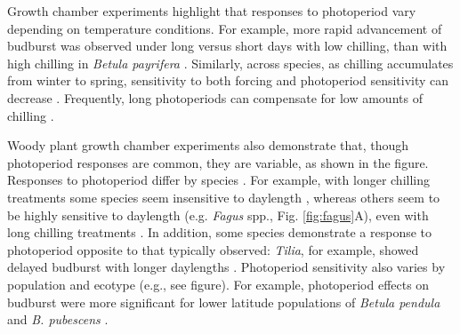 \documentclass{article}
\begin{document}
\par Growth chamber experiments highlight that responses to photoperiod vary depending on temperature conditions. For example, more rapid advancement of budburst was observed under long versus short days with low chilling, than with high chilling in \emph{Betula payrifera} \citep[][see figure]{Hawkins:2012}. Similarly, across species, as chilling accumulates from winter to spring, sensitivity to both forcing and photoperiod sensitivity can decrease \citep{malyshev2018}. Frequently, long photoperiods can compensate for low amounts of chilling \citep{Caffarra:2011b,Myking:1995,Heide:1993}.%
\par Woody plant growth chamber experiments also demonstrate that, though photoperiod responses are common, they are variable, as shown in the figure. Responses to photoperiod differ by species \citep[e.g.,][]{flynn2018,zohner2016,Basler:2014aa,Basler:2012,Howe:1996,Heide:1993a}.
For example, with longer chilling treatments some species seem insensitive to daylength \citep[e.g., \emph{Hammamelis} spp., \emph{Prunus} spp.,][]{zohner2016}, %
whereas others seem to be highly sensitive to daylength (e.g. \emph{Fagus} spp., Fig. \ref{fig:fagus}A), even with long chilling treatments \citep{zohner2016}. In addition, some species demonstrate a response to photoperiod opposite to that typically observed: \emph{Tilia}, for example, showed delayed budburst with longer daylengths \citep[see figure,][]{Ashby:1962aa}. %
Photoperiod sensitivity also varies by population and ecotype (e.g., see figure). For example, photoperiod effects on budburst were more significant for lower latitude populations of \emph{Betula pendula} and \emph{B. pubescens} \citep{Partanen:2005aa}. 
\end{document}
